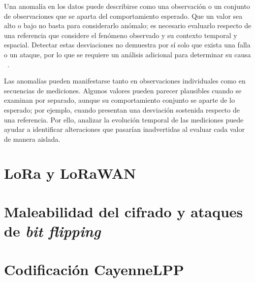 Una anomalía en los datos puede describirse como una observación o un conjunto de observaciones que se aparta del comportamiento esperado. Que un valor sea alto o bajo no basta para considerarlo anómalo; es necesario evaluarlo respecto de una referencia que considere el fenómeno observado y su contexto temporal y espacial. Detectar estas desviaciones no demuestra por sí solo que exista una falla o un ataque, por lo que se requiere un análisis adicional para determinar su causa ~\cite{chandola2009anomaly}.

Las anomalías pueden manifestarse tanto en observaciones individuales como en secuencias de mediciones. Algunos valores pueden parecer plausibles cuando se examinan por separado, aunque su comportamiento conjunto se aparte de lo esperado; por ejemplo, cuando presentan una desviación sostenida respecto de una referencia. Por ello, analizar la evolución temporal de las mediciones puede ayudar a identificar alteraciones que pasarían inadvertidas al evaluar cada valor de manera aislada.

\section{LoRa y LoRaWAN}                                    %

\section{Maleabilidad del cifrado y ataques de \textit{bit flipping}}  %

\section{Codificación CayenneLPP}                           %

